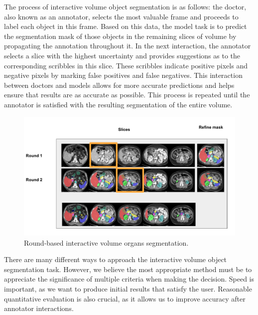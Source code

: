 The process of interactive volume object segmentation is as follows: the doctor, also known as an annotator, selects the most valuable frame and proceeds to label each object in this frame. Based on this data, the model task is to predict the segmentation mask of those objects in the remaining slices of volume by propagating the annotation throughout it. In the next interaction, the annotator selects a slice with the highest uncertainty and provides suggestions as to the corresponding scribbles in this slice. These scribbles indicate positive pixels and negative pixels by marking false positives and false negatives. This interaction between doctors and models allows for more accurate predictions and helps ensure that results are as accurate as possible. This process is repeated until the annotator is satisfied with the resulting segmentation of the entire volume.

\begin{figure}[h]
    \centering
    \includegraphics[width=\textwidth]{content/resources/new_images/intro/interactive.pdf}
    \caption{Round-based interactive volume organs segmentation.}
    \label{fig:ivos}
\end{figure}


There are many different ways to approach the interactive volume object segmentation task. However, we believe the most appropriate method must be to appreciate the significance of multiple criteria when making the decision. Speed is important, as we want to produce initial results that satisfy the user. Reasonable quantitative evaluation is also crucial, as it allows us to improve accuracy after annotator interactions.

